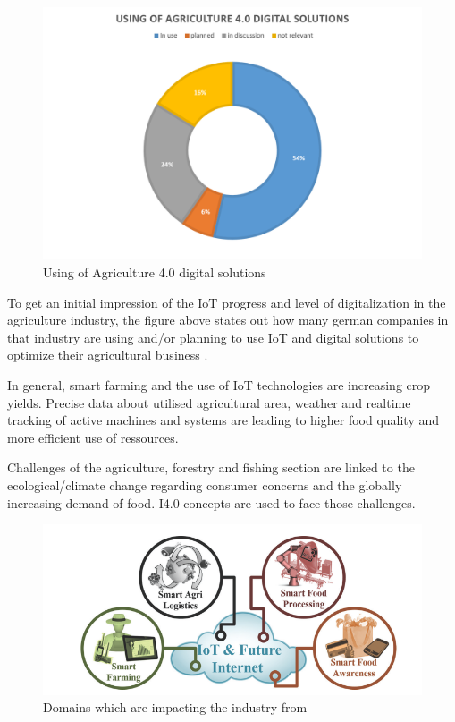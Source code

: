 \begin{figure}[H]
\centering
\includegraphics[width=1\columnwidth]{images/usingOfAgriculure4-0-solutions_pieChart}
\caption{Using of Agriculture 4.0 digital solutions \cite{digitAgrad}}
\end{figure}


To get an initial impression of the \ac{IoT} progress and level of digitalization in the agriculture industry, the figure above states out how many german companies in that industry are using and/or planning to use \ac{IoT} and digital solutions to optimize their agricultural business \cite{digitAgrad}.

In general, smart farming and the use of \ac{IoT} technologies are increasing crop yields. Precise data about utilised agricultural area, weather and realtime tracking of active machines and systems are leading to higher food quality and more efficient use of ressources.

Challenges of the agriculture, forestry and fishing section are linked to the ecological/climate change regarding consumer concerns and the globally increasing demand of food. \ac{I4.0} concepts are used to face those challenges.


\begin{figure}[H]
\centering
\includegraphics[width=1\columnwidth]{images/digitising-industry_agriculture_smartFarming}
\caption{Domains which are impacting the industry from \cite[p.133]{FoodAndFarm2020}}
\end{figure}


